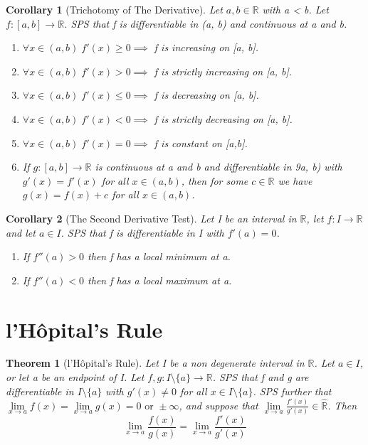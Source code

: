 \documentclass[11pt, oneside]{book}
\theoremstyle{break}
\newtheorem{thm}{Theorem}[section]
\newtheorem{crly}{Corollary}[thm]
\newcommand{\bb}[1]{\mathbb{#1}}			%
\begin{document}
\begin{crly}[Trichotomy of The Derivative]
	Let $a, b \in \bb{R}$ with a < b. Let $f: [a, b] \to \bb{R}$. SPS that f is differentiable in (a, b) and continuous at a and b.
	\begin{enumerate}
		\item $\forall x \in (a, b) \; f'(x) \geq 0 \implies $ f is increasing on [a, b].
		\item $\forall x \in (a, b) \; f'(x) > 0 \implies $ f is strictly increasing on [a, b].
		\item $\forall x \in (a, b) \; f'(x) \leq 0 \implies $ f is decreasing on [a, b].
		\item $\forall x \in (a, b) \; f'(x) < 0 \implies $ f is strictly decreasing on [a, b].
		\item $\forall x \in (a, b) \; f'(x) = 0 \implies $ f is constant on [a,b].
		\item If $g: [a ,b] \to \bb{R}$ is continuous at a and b and differentiable in 9a, b) with $g'(x) = f'(x)$ for all $x \in (a, b)$, then for some $c \in \bb{R}$ we have $g(x) = f(x) + c$ for all $x \in (a, b)$.
	\end{enumerate}
\end{crly}

\begin{crly}[The Second Derivative Test]
	Let I be an interval in $\bb{R}$, let $f: I \to \bb{R}$ and let $a \in I$. SPS that f is differentiable in I with $f'(a) = 0$.
	\begin{enumerate}
		\item If $f''(a) > 0$ then f has a local minimum at a.
		\item If $f''(a) < 0$ then f has a local maximum at a.
	\end{enumerate}
\end{crly}


\section{l'Hôpital's Rule}

\begin{thm}[l'Hôpital's Rule]
	Let I be a non degenerate interval in $\bb{R}$. Let $a \in I$, or let a be an endpoint of I. Let $f, g: I \setminus \{a\} \to \bb{R}$. SPS that f and g are differentiable in $I \setminus \{a\}$ with $g'(x) \neq 0$ for all $x \in I \setminus \{a\}$. SPS further that $\lim\limits_{x \to a} f(x) = \lim\limits_{x \to a} g(x) = 0 \text{ or } \pm \infty$, and suppose that $\lim\limits_{x \to a} \frac{f'(x)}{g'(x)} \in \hat{\bb{R}}$. Then
	\[
		\lim_{x \to a} \frac{f(x)}{g(x)} = \lim_{x \to a} \frac{f'(x)}{g'(x)}
	\]
\end{thm}
\end{document}
